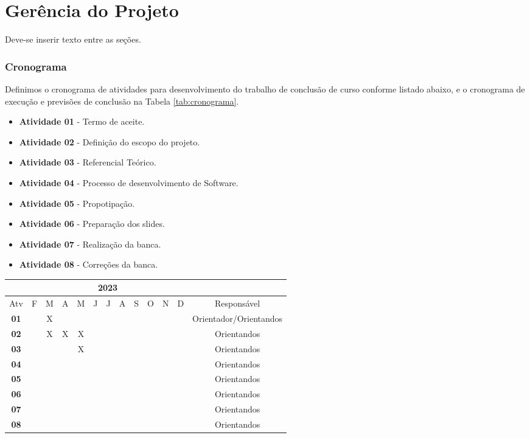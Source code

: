 \chapter{Gerência do Projeto}\label{cap:desenvolvimento}
Deve-se inserir texto entre as seções.
\subsection{Cronograma}

Definimos o cronograma de atividades para desenvolvimento do trabalho de conclusão de curso conforme listado abaixo, e o cronograma de execução e previsões de conclusão na Tabela \ref{tab:cronograma}.

\begin{itemize}
    \item \textbf{Atividade 01} - Termo de aceite.
    \item \textbf{Atividade 02} - Definição do escopo do projeto.
    \item \textbf{Atividade 03} - Referencial Teórico.
    \item \textbf{Atividade 04} - Processo de desenvolvimento de Software.
    \item \textbf{Atividade 05} - Propotipação.
    \item \textbf{Atividade 06} - Preparação dos slides.
    \item \textbf{Atividade 07} - Realização da banca.
    \item \textbf{Atividade 08} - Correções da banca.
\end{itemize}

\begin{table*}[ht]
\centering
\caption{Cronograma das atividades}
\label{tab:cronograma}
\begin{tabular}{|c|c|c|c|c|c|c|c|c|c|c|c|c|}
\hline & \multicolumn{11}{|c|}{2023} & \multicolumn{1}{|c|}{} \\
\hline \multicolumn{1}{|c|}{Atv} & F & M & A & M & J & J & A & S & O & N & D & {Responsável} \\
\hline \textbf{01} & & X& & & & & & & & & & Orientador/Orientandos \\
\hline \textbf{02} & & X& X& X& & & & & & & & Orientandos \\
\hline \textbf{03} & & & & X& & & & & & & & Orientandos\\
\hline \textbf{04} & & & & & & & & & & & & Orientandos\\
\hline \textbf{05} & & & & & & & & & & & & Orientandos\\
\hline \textbf{06} & & & & & & & & & & & & Orientandos\\
\hline \textbf{07} & & & & & & & & & & & & Orientandos\\
\hline \textbf{08} & & & & & & & & & & & & Orientandos\\
\hline
\end{tabular} 
\end{table*}

